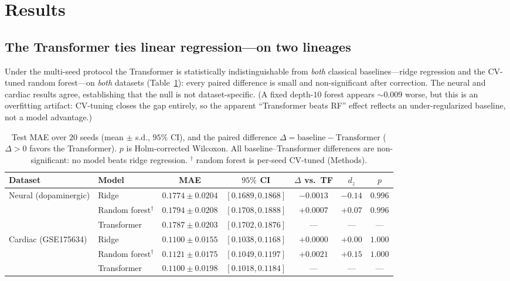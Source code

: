 \documentclass[11pt]{article}
\newcommand{\dz}{d_{z}}
\begin{document}
\section{Results}

\subsection{The Transformer ties linear regression---on two lineages}\label{sec:multiseed}
Under the multi-seed protocol the Transformer is statistically indistinguishable
from \emph{both} classical baselines---ridge regression and the CV-tuned random
forest---on \emph{both} datasets (Table~\ref{tab:main}): every paired difference is
small and non-significant after correction. The neural and cardiac results agree,
establishing that the null is not dataset-specific. (A fixed depth-$10$ forest
appears $\sim$0.009 worse, but this is an overfitting artifact: CV-tuning closes the
gap entirely, so the apparent ``Transformer beats RF'' effect reflects an
under-regularized baseline, not a model advantage.)

\begin{table}[h]\centering
\caption{Test MAE over $20$ seeds (mean $\pm$ s.d., $95\%$ CI), and the paired
difference $\Delta=\text{baseline}-\text{Transformer}$ ($\Delta>0$ favors the
Transformer). $p$ is Holm-corrected Wilcoxon. All baseline--Transformer differences
are non-significant: no model beats ridge regression.
$^\dagger$ random forest is per-seed CV-tuned (Methods).}
\label{tab:main}
\begin{tabular}{llccccc}
\toprule
Dataset & Model & MAE & $95\%$ CI & $\Delta$ vs.\ TF & $\dz$ & $p$ \\
\midrule
\multirow{3}{*}{Neural (dopaminergic)}
 & Ridge            & $0.1774\pm0.0204$ & $[0.1689,0.1868]$ & $-0.0013$ & $-0.14$ & $0.996$ \\
 & Random forest$^\dagger$ & $0.1794\pm0.0208$ & $[0.1708,0.1888]$ & $+0.0007$ & $+0.07$ & $0.996$ \\
 & Transformer      & $0.1787\pm0.0203$ & $[0.1702,0.1876]$ & ---       & ---     & ---     \\
\midrule
\multirow{3}{*}{Cardiac (GSE175634)}
 & Ridge            & $0.1100\pm0.0155$ & $[0.1038,0.1168]$ & $+0.0000$ & $+0.00$ & $1.000$ \\
 & Random forest$^\dagger$ & $0.1121\pm0.0175$ & $[0.1049,0.1197]$ & $+0.0021$ & $+0.15$ & $1.000$ \\
 & Transformer      & $0.1100\pm0.0198$ & $[0.1018,0.1184]$ & ---       & ---     & ---     \\
\bottomrule
\end{tabular}
\end{table}
\end{document}
